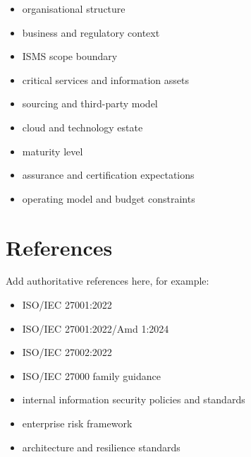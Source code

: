 \documentclass[
  letterpaper,
  DIV=11,
  numbers=noendperiod]{scrartcl}
\providecommand{\tightlist}{%
  \setlength{\itemsep}{0pt}\setlength{\parskip}{0pt}}
\begin{document}
\begin{itemize}
\tightlist
\item
  organisational structure
\item
  business and regulatory context
\item
  ISMS scope boundary
\item
  critical services and information assets
\item
  sourcing and third-party model
\item
  cloud and technology estate
\item
  maturity level
\item
  assurance and certification expectations
\item
  operating model and budget constraints
\end{itemize}

\section{References}\label{references}

Add authoritative references here, for example:

\begin{itemize}
\tightlist
\item
  ISO/IEC 27001:2022
\item
  ISO/IEC 27001:2022/Amd 1:2024
\item
  ISO/IEC 27002:2022
\item
  ISO/IEC 27000 family guidance
\item
  internal information security policies and standards
\item
  enterprise risk framework
\item
  architecture and resilience standards
\end{itemize}
\end{document}
